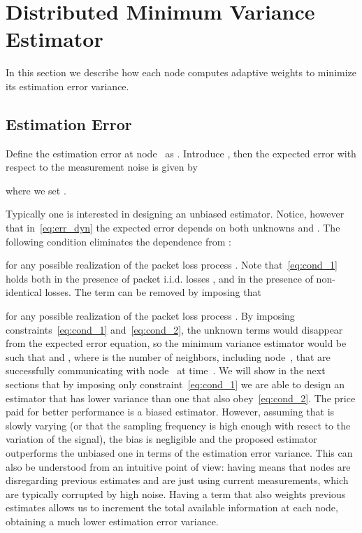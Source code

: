\documentclass[a4paper,notitlepage,onecolumn]{article}
\numberwithin{equation}{section}
\begin{document}
\section{Distributed Minimum Variance Estimator}
\label{sec:distrib_min_var_estim} In this section we
describe how each node computes adaptive weights to
minimize its estimation error variance.

\subsection{Estimation Error}

Define the estimation error at node~ as .
Introduce , then the expected error with respect to the measurement noise  is given by

where we set .

Typically one is interested in designing an unbiased estimator.
Notice, however that in~\eqref{eq:err_dyn} the expected error
depends on both unknowns  and .  The following
condition eliminates the dependence from :

for any possible realization of the packet loss process
. Note that~\eqref{eq:cond_1} holds both in the
presence of packet i.i.d. losses , and in the presence of
non-identical losses. The term  can be removed by
imposing that

for any possible realization of the packet loss process
. By imposing constraints~\eqref{eq:cond_1}
and~\eqref{eq:cond_2}, the unknown terms would disappear from the
expected error equation, so the minimum variance estimator would
be such that  and , where
 is the number of neighbors, including
node~, that are successfully communicating with node~ at
time~. We will show in the next sections that by imposing only
constraint~\eqref{eq:cond_1} we are able to design an estimator
that has lower variance than one that also obey~\eqref{eq:cond_2}.
The price paid for better performance is a biased estimator.
However, assuming that  is slowly varying (or that the
sampling frequency is high enough with resect to the variation of
the signal), the bias is negligible and the proposed estimator
outperforms the unbiased one in terms of the estimation error
variance. This can also be understood from an intuitive point of
view: having  means that nodes are
disregarding previous estimates and are just using current
measurements, which are typically corrupted by high noise. Having
a term that also weights previous estimates allows us to increment
the total available information at each node, obtaining a much
lower estimation error variance.
\end{document}
